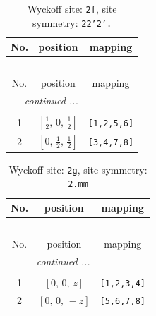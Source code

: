 \documentclass[fleqn,8pt]{jsarticle}
\begin{document}
\renewcommand{\arraystretch}{1.2}
\begin{longtable}{ccc}
\caption{Wyckoff site: {\tt 2f}, site symmetry: {\tt 22'2'.}}
 \\
 \hline \hline
No. & position & mapping \\ \hline \endfirsthead

\multicolumn{2}{l}{\tablename\ \thetable{}} \\
 \hline \hline
No. & position & mapping \\ \hline \endhead

 \hline \hline
\multicolumn{2}{r}{\footnotesize\it continued ...} \\ \endfoot

 \hline \hline
\multicolumn{2}{r}{} \\ \endlastfoot

1 & $\left[ \frac{1}{2},\, 0,\, \frac{1}{2} \right]$ & {\tt [1,2,5,6]} \\ \hline
2 & $\left[ 0,\, \frac{1}{2},\, \frac{1}{2} \right]$ & {\tt [3,4,7,8]} \\
\end{longtable}
\renewcommand{\arraystretch}{1.2}
\begin{longtable}{ccc}
\caption{Wyckoff site: {\tt 2g}, site symmetry: {\tt 2.mm}}
 \\
 \hline \hline
No. & position & mapping \\ \hline \endfirsthead

\multicolumn{2}{l}{\tablename\ \thetable{}} \\
 \hline \hline
No. & position & mapping \\ \hline \endhead

 \hline \hline
\multicolumn{2}{r}{\footnotesize\it continued ...} \\ \endfoot

 \hline \hline
\multicolumn{2}{r}{} \\ \endlastfoot

1 & $\left[ 0,\, 0,\, z \right]$ & {\tt [1,2,3,4]} \\ \hline
2 & $\left[ 0,\, 0,\, - z \right]$ & {\tt [5,6,7,8]} \\
\end{longtable}
\renewcommand{\arraystretch}{1.2}
\end{document}
